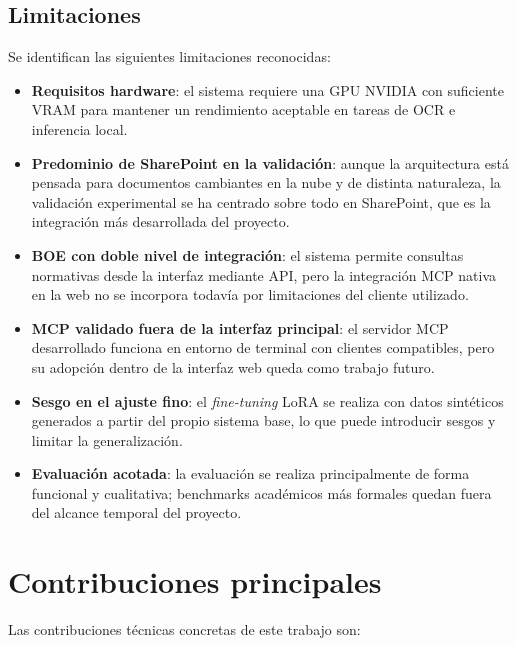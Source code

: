 \subsection{Limitaciones}

Se identifican las siguientes limitaciones reconocidas:

\begin{itemize}
    \item \textbf{Requisitos hardware}: el sistema requiere una GPU NVIDIA con suficiente VRAM para mantener un rendimiento aceptable en tareas de OCR e inferencia local.

    \item \textbf{Predominio de SharePoint en la validación}: aunque la arquitectura está pensada para documentos cambiantes en la nube y de distinta naturaleza, la validación experimental se ha centrado sobre todo en SharePoint, que es la integración más desarrollada del proyecto.

    \item \textbf{BOE con doble nivel de integración}: el sistema permite consultas normativas desde la interfaz mediante API, pero la integración MCP nativa en la web no se incorpora todavía por limitaciones del cliente utilizado.

    \item \textbf{MCP validado fuera de la interfaz principal}: el servidor MCP desarrollado funciona en entorno de terminal con clientes compatibles, pero su adopción dentro de la interfaz web queda como trabajo futuro.

    \item \textbf{Sesgo en el ajuste fino}: el \textit{fine-tuning} LoRA se realiza con datos sintéticos generados a partir del propio sistema base, lo que puede introducir sesgos y limitar la generalización.

    \item \textbf{Evaluación acotada}: la evaluación se realiza principalmente de forma funcional y cualitativa; benchmarks académicos más formales quedan fuera del alcance temporal del proyecto.
\end{itemize}

\section{Contribuciones principales}

Las contribuciones técnicas concretas de este trabajo son:

